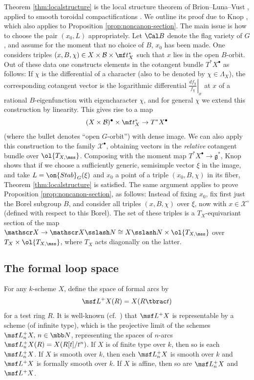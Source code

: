 \documentclass[final]{amsart}
\theoremstyle{remark}
\theoremstyle{definition}
\numberwithin{equation}{section}
\begin{document}
Theorem \ref{thm:localstructure} is the local structure theorem of Brion--Luna--Vust \cite[Th\'eor\`eme 3.5]{BLV}, applied to smooth toroidal compactifications \cite{KnLV}. We outline its proof due to Knop \cite[Theorem 2.3]{KnMotion}, which also applies to Proposition \ref{prop:noncanon-section}. The main issue is how to choose the pair $(x_0,L)$ appropriately. 
Let $\Cal B$ denote the flag variety of $G$, and assume for the moment that no choice of $B$, $x_0$ has been made.
One considers triples $(x,B,\chi) \in X\times\mathcal B\times \mf t_X^*$ such that 
$x$ lies in the open $B$-orbit. Out of these data one constructs elements in the cotangent bundle $T^*X^\bullet$ as follows: If $\chi$ is the differential of a character (also to be denoted by $\chi\in \Lambda_X$), the corresponding cotangent vector is the logarithmic differential $\left.\frac{d f_\chi}{f_\chi}\right|_x$ at $x$ of a rational $B$-eigenfunction with eigencharacter $\chi$, and for general $\chi$ we extend this construction by linearity. This gives rise to a map 
\[ (X\times\mathcal B)^\bullet \times \mf t_X^* \to T^*X^\bullet \]
(where the bullet denotes ``open $G$-orbit'') with dense image. We can also apply this construction to the family $\mathscr X^\bullet$, obtaining vectors in the \emph{relative} cotangent bundle over $\ol{T_{X,\mss}}$. Composing with the moment map $T^*X^\bullet \to \mathfrak g^*$, Knop shows that if we choose a sufficiently generic, semisimple vector $\xi$ in the image, and take $L=\on{Stab}_G(\xi)$ and $x_0$ a point of a triple $(x_0, B, \chi)$ in its fiber, Theorem \ref{thm:localstructure} is satisfied. The same argument applies to prove Proposition \ref{prop:noncanon-section}, as follows: Instead of fixing $x_0$, fix first just the Borel subgroup $B$, and consider all triples $(x,B,\chi)$ over $\xi$, now with $x \in \mathscr X^\circ$ (defined with respect to this Borel). The set of these triples is a 
$T_X$-equivariant section of the map 
$\mathscr X \to \mathscr X\sslash N \cong X\sslash N \times \ol{T_{X,\mss}}$ 
over $T_X\times \ol{T_{X,\mss}}$, where $T_X$ acts diagonally on the latter. 



\subsection{The formal loop space}
\label{sect:formalloop}
For any $k$-scheme $X$, define the space of formal arcs by
\[ \msf L^+ X(R) = X(R\tbrac t) \] 
for a test ring $R$. 
It is well-known (cf.~\cite[Proposition 1.2.1]{KV}) that $\msf L^+ X$ is representable by a scheme (of infinite type), which is
the projective limit of the schemes $\msf L^+_n X,\, n \in \mbb N$, 
representing the spaces of $n$-arcs 
$\msf L^+_n X(R) = X(R[t]/t^n)$.
If $X$ is of finite type over $k$, then so is each $\msf L^+_n X$. If $X$ is smooth over $k$, then each $\msf L^+_n X$ is smooth over $k$
and $\msf L^+ X$ is formally smooth over $k$. If $X$ is affine, then so are
$\msf L^+_n X$ and $\msf L^+ X$. 
\end{document}
